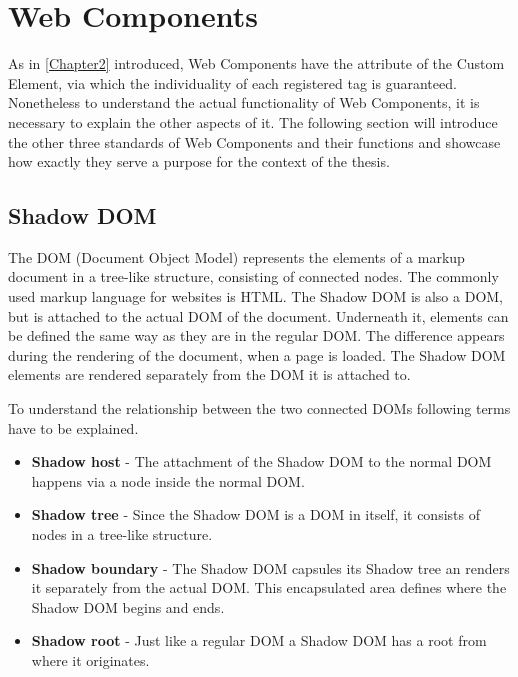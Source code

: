 \chapter{Web Components} %
\label{Chapter4}


As in \ref{Chapter2} introduced, Web Components have the attribute of the Custom Element, via which the individuality of each registered tag is guaranteed.
Nonetheless to understand the actual functionality of Web Components, it is necessary to explain the other aspects of it.
The following section will introduce the other three standards of Web Components and their functions and showcase how exactly they serve a purpose for the context of the thesis.

\section{Shadow DOM}

The DOM (Document Object Model) represents the elements of a markup document in a tree-like structure, consisting of connected nodes. The commonly used markup language for websites is HTML. \cite{wc_shadow_dom}
The Shadow DOM is also a DOM, but is attached to the actual DOM of the document. Underneath it, elements can be defined the same way as they are in the regular DOM. The difference appears during the rendering of the document, when a page is loaded. The Shadow DOM elements are rendered separately from the DOM it is attached to.\cite{simon_thesis}

To understand the relationship between the two connected DOMs following terms have to be explained.

\begin{itemize}
	\item \textbf{Shadow host} - The attachment of the Shadow DOM to the normal DOM happens via a node inside the normal DOM.
	\item \textbf{Shadow tree} - Since the Shadow DOM is a DOM in itself, it consists of nodes in a tree-like structure.
	\item \textbf{Shadow boundary} - The Shadow DOM capsules its Shadow tree an renders it separately from the actual DOM. This encapsulated area defines where the Shadow DOM begins and ends.
	\item \textbf{Shadow root} - Just like a regular DOM a Shadow DOM has a root from where it originates.
\end{itemize} 

